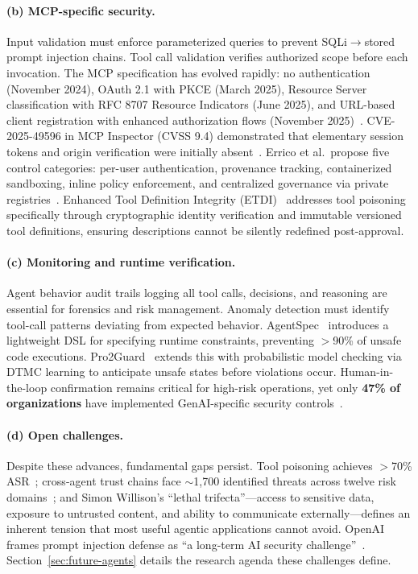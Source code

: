 \paragraph{(b) MCP-specific security.}
Input validation must enforce parameterized queries to prevent SQLi$\to$stored prompt injection chains. Tool call validation verifies authorized scope before each invocation. The MCP specification has evolved rapidly: no authentication (November 2024), OAuth 2.1 with PKCE (March 2025), Resource Server classification with RFC 8707 Resource Indicators (June 2025), and URL-based client registration with enhanced authorization flows (November 2025)~\cite{mcpspec2025}. CVE-2025-49596 in MCP Inspector (CVSS 9.4) demonstrated that elementary session tokens and origin verification were initially absent~\cite{oligo2025inspector}. Errico et al.\ propose five control categories: per-user authentication, provenance tracking, containerized sandboxing, inline policy enforcement, and centralized governance via private registries~\cite{errico2025mcpsecurity}. Enhanced Tool Definition Integrity (ETDI)~\cite{bhatt2025etdi} addresses tool poisoning specifically through cryptographic identity verification and immutable versioned tool definitions, ensuring descriptions cannot be silently redefined post-approval.

\paragraph{(c) Monitoring and runtime verification.}
Agent behavior audit trails logging all tool calls, decisions, and reasoning are essential for forensics and risk management. Anomaly detection must identify tool-call patterns deviating from expected behavior. AgentSpec~\cite{wang2025agentspec} introduces a lightweight DSL for specifying runtime constraints, preventing $>$90\% of unsafe code executions. Pro2Guard~\cite{pro2guard2025} extends this with probabilistic model checking via DTMC learning to anticipate unsafe states before violations occur. Human-in-the-loop confirmation remains critical for high-risk operations, yet only \textbf{47\% of organizations} have implemented GenAI-specific security controls~\cite{microsoft2026cyberpulse}.

\paragraph{(d) Open challenges.}
Despite these advances, fundamental gaps persist. Tool poisoning achieves $>$70\% ASR~\cite{invariant2025toolpoisoning}; cross-agent trust chains face $\sim$1,700 identified threats across twelve risk domains~\cite{multiagent2026threats}; and Simon Willison's ``lethal trifecta''---access to sensitive data, exposure to untrusted content, and ability to communicate externally---defines an inherent tension that most useful agentic applications cannot avoid. OpenAI frames prompt injection defense as ``a long-term AI security challenge''~\cite{openai2025atlas}. Section~\ref{sec:future-agents} details the research agenda these challenges define.

